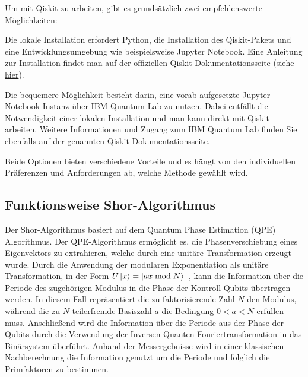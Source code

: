 \documentclass[
  a4paper, %
  10pt, %
  unnumberedsections, %
  twoside, %
]{LTJournalArticle}
\begin{document}
Um mit Qiskit zu arbeiten, gibt es grundsätzlich zwei empfehlenswerte Möglichkeiten:
\begin{description}[style=nextline]
\item[Lokale Installation]
Die lokale Installation erfordert Python,
die Installation des Qiskit-Pakets und eine Entwicklungsumgebung wie beispielsweise Jupyter Notebook.
Eine Anleitung zur Installation findet man auf der offiziellen Qiskit-Dokumentationsseite
(siehe \href{https://qiskit.org/documentation/stable/0.24/install.html}{hier}).
\item[IBM Quantum Lab]
Die bequemere Möglichkeit besteht darin,
eine vorab aufgesetzte Jupyter Notebook-Instanz über
\href{https://qiskit.org/documentation/stable/0.24/install.html}{IBM Quantum Lab}
zu nutzen.
Dabei entfällt die Notwendigkeit einer lokalen Installation und man kann direkt mit Qiskit arbeiten.
Weitere Informationen und Zugang zum IBM Quantum Lab finden Sie ebenfalls auf der genannten Qiskit-Dokumentationsseite.
\end{description}
Beide Optionen bieten verschiedene Vorteile und es hängt von den individuellen Präferenzen und Anforderungen ab,
welche Methode gewählt wird.

\subsection{Funktionsweise Shor-Algorithmus}

Der Shor-Algorithmus basiert auf dem Quantum Phase Estimation (QPE) Algorithmus.
Der QPE-Algorithmus ermöglicht es, die Phasenverschiebung eines Eigenvektors zu extrahieren,
welche durch eine unitäre Transformation erzeugt wurde.
Durch die Anwendung der modularen Exponentiation als unitäre Transformation,
in der Form \(U\ket{x} = \ket{ax \bmod N}\)~\autocite{IBM:Shor},
kann die Information über die Periode des zugehörigen Modulus in die Phase der Kontroll-Qubits übertragen werden.
In diesem Fall repräsentiert die zu faktorisierende Zahl \(N\) den Modulus,
während die zu \(N\) teilerfremde Basiszahl \(a\) die Bedingung \(0 < a < N\) erfüllen muss.
Anschließend wird die Information über die Periode aus der Phase der Qubits
durch die Verwendung der Inversen Quanten-Fouriertransformation in das Binärsystem überführt.
Anhand der Messergebnisse wird in einer klassischen Nachberechnung die Information genutzt
um die Periode und folglich die Primfaktoren zu bestimmen.
\end{document}
